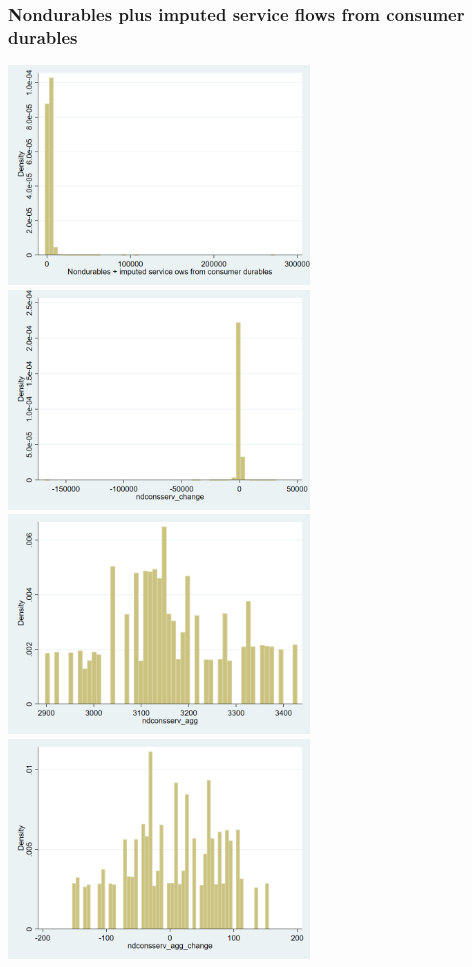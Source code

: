 \documentclass[12pt,a4paper]{article}
\begin{document}
\subsubsection*{Nondurables plus imputed service flows from consumer durables}
\begin{center}
\includegraphics[width=8cm]{ndconsserv.png}
\includegraphics[width=8cm]{ndconsserv_change.png}\\
\includegraphics[width=8cm]{ndconsserv_agg.png}
\includegraphics[width=8cm]{ndconsserv_agg_change.png}\\

\end{center}
\end{document}
